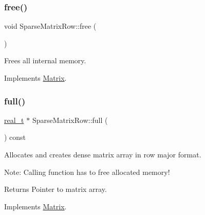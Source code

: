 \mbox{\label{class_sparse_matrix_row_a5295955ae17b29db89b8fc2607bab8c8}} 
\subsubsection{\texorpdfstring{free()}{free()}}
{\footnotesize\ttfamily void Sparse\+Matrix\+Row\+::free (\begin{DoxyParamCaption}{ }\end{DoxyParamCaption})\hspace{0.3cm}{\ttfamily [virtual]}}

Frees all internal memory. 

Implements \hyperlink{class_matrix_ae13ca77389c2eae7b3eba79cb9fefecb}{Matrix}.

\mbox{\label{class_sparse_matrix_row_ae074d0a3c434867b07552401e9b3174d}} 
\subsubsection{\texorpdfstring{full()}{full()}}
{\footnotesize\ttfamily \hyperlink{qp_o_a_s_e_s__wrapper_8h_a0d00e2b3dfadee81331bbb39068570c4}{real\+\_\+t} $\ast$ Sparse\+Matrix\+Row\+::full (\begin{DoxyParamCaption}{ }\end{DoxyParamCaption}) const\hspace{0.3cm}{\ttfamily [virtual]}}

Allocates and creates dense matrix array in row major format.

Note\+: Calling function has to free allocated memory!

\begin{DoxyReturn}{Returns}
Pointer to matrix array. 
\end{DoxyReturn}


Implements \hyperlink{class_matrix_ac53a5bbb05c6a928af17e0d88220ff63}{Matrix}.

\mbox{\label{class_sparse_matrix_row_aaacf7bd37dd3c4644256ce6635026856}} 
